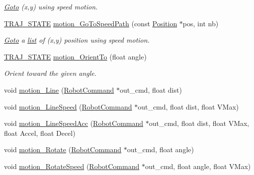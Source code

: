 \begin{DoxyCompactItemize}
\begin{DoxyCompactList}\small\item\em \hyperlink{classGoto}{Goto} (x,y) using speed motion. \end{DoxyCompactList}\item 
\mbox{\label{classAsservInsa_a2c7ff3570217f3bd521b780ac6e3b530}} 
\hyperlink{path__manager_8h_adb3360abeb29758da93865c8afcb80eb}{T\+R\+A\+J\+\_\+\+S\+T\+A\+TE} \hyperlink{classAsservInsa_a2c7ff3570217f3bd521b780ac6e3b530}{motion\+\_\+\+Go\+To\+Speed\+Path} (const \hyperlink{structPosition}{Position} $\ast$pos, int nb)
\begin{DoxyCompactList}\small\item\em \hyperlink{classGoto}{Goto} a \hyperlink{protocollist-p}{list} of (x,y) position using speed motion. \end{DoxyCompactList}\item 
\mbox{\label{classAsservInsa_aea5aa879c72353a31b186a11a11ef08c}} 
\hyperlink{path__manager_8h_adb3360abeb29758da93865c8afcb80eb}{T\+R\+A\+J\+\_\+\+S\+T\+A\+TE} \hyperlink{classAsservInsa_aea5aa879c72353a31b186a11a11ef08c}{motion\+\_\+\+Orient\+To} (float angle)
\begin{DoxyCompactList}\small\item\em Orient toward the given angle. \end{DoxyCompactList}\item 
void \hyperlink{classAsservInsa_ab0fe0ad459e394938598a8b031118edb}{motion\+\_\+\+Line} (\hyperlink{structRobotCommand}{Robot\+Command} $\ast$out\+\_\+cmd, float dist)
\item 
void \hyperlink{classAsservInsa_af0aa05c12a2d8eb278f84e1b7472ca83}{motion\+\_\+\+Line\+Speed} (\hyperlink{structRobotCommand}{Robot\+Command} $\ast$out\+\_\+cmd, float dist, float V\+Max)
\item 
void \hyperlink{classAsservInsa_af749fa1a3cefdb6593451a2ff4114bd8}{motion\+\_\+\+Line\+Speed\+Acc} (\hyperlink{structRobotCommand}{Robot\+Command} $\ast$out\+\_\+cmd, float dist, float V\+Max, float Accel, float Decel)
\item 
void \hyperlink{classAsservInsa_ae7c7edab12c43ce352a694e95994c972}{motion\+\_\+\+Rotate} (\hyperlink{structRobotCommand}{Robot\+Command} $\ast$out\+\_\+cmd, float angle)
\item 
void \hyperlink{classAsservInsa_a1c9e34ba184f7d4c651955185d022605}{motion\+\_\+\+Rotate\+Speed} (\hyperlink{structRobotCommand}{Robot\+Command} $\ast$out\+\_\+cmd, float angle, float V\+Max)

\end{DoxyCompactItemize}
